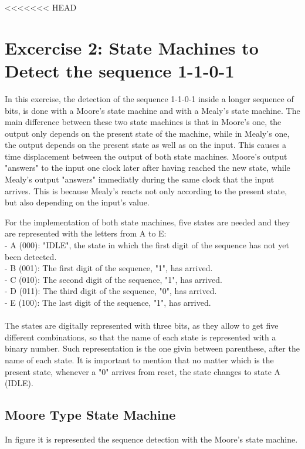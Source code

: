 <<<<<<< HEAD

\section{\color{olive}Excercise 2: State Machines to Detect the sequence 1-1-0-1}
In this exercise, the detection of the sequence 1-1-0-1 inside a longer sequence of bits, is done with a Moore's state machine and with a Mealy's state machine. The main difference between these two state machines is that in Moore's one, the output only depends on the present state of the machine, while in Mealy's one, the output depends on the present state as well as on the input. This causes a time displacement between the output of both state machines. Moore's output "answers" to the input one clock later after having reached the new state, while Mealy's output "answers" immediatly during the same clock that the input arrives. This is because Mealy's reacts not only according to the present state, but also depending on the input's value.

For the implementation of both state machines, five states are needed and they are represented with the letters from A to E:\\ 
- A (000): "IDLE", the state in which the first digit of the sequence has not yet been detected.\\
- B (001): The first digit of the sequence, "1", has arrived.\\
- C (010): The second digit of the sequence, "1",  has arrived.\\
- D (011): The third digit of the sequence, "0", has arrived.\\
- E (100): The last digit of the sequence, "1", has arrived.\\ \\
The states are digitally represented with three bits, as they allow to get five different combinations, so that the name of each state is represented with a binary number. Such representation is the one givin between parenthese, after the name of each state.  It is important to mention that no matter which is the present state, whenever a "0" arrives from reset, the state changes to state A (IDLE). 

\subsection{\color{purple}Moore Type State Machine}

In figure %
it is represented the sequence detection with the Moore's state machine.

